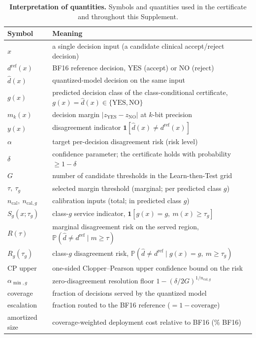 \documentclass[11pt]{article}
\theoremstyle{plain}
\newcommand{\YES}{\mathrm{YES}}
\newcommand{\NO}{\mathrm{NO}}
\newcommand{\Prob}{\mathbb{P}}
\newcommand{\Risk}{R}
\begin{document}
\begin{table}[h]\centering\small
\caption{\textbf{Interpretation of quantities.} Symbols and quantities used in the certificate and
throughout this Supplement.}
\label{stab:notation}
\setlength{\tabcolsep}{8pt}
\renewcommand{\arraystretch}{1.18}
\begin{tabular}{ll}
\toprule
Symbol & Meaning\\
\midrule
$x$ & a single decision input (a candidate clinical accept/reject decision)\\
$d^{\mathrm{ref}}(x)$ & BF16 reference decision, $\YES$ (accept) or $\NO$ (reject)\\
$\hat d(x)$ & quantized-model decision on the same input\\
$g(x)$ & predicted decision class of the class-conditional certificate, $g(x)=\hat d(x)\in\{\YES,\NO\}$\\
$m_k(x)$ & decision margin $|z_\YES-z_\NO|$ at $k$-bit precision\\
$y(x)$ & disagreement indicator $\mathbf{1}[\hat d(x)\neq d^{\mathrm{ref}}(x)]$\\
$\alpha$ & target per-decision disagreement risk (risk level)\\
$\delta$ & confidence parameter; the certificate holds with probability $\ge 1-\delta$\\
$G$ & number of candidate thresholds in the Learn-then-Test grid\\
$\tau,\ \tau_g$ & selected margin threshold (marginal; per predicted class $g$)\\
$n_{\mathrm{cal}},\ n_{\mathrm{cal},g}$ & calibration inputs (total; in predicted class $g$)\\
$S_g(x;\tau_g)$ & class-$g$ service indicator, $\mathbf{1}[g(x)=g,\ m(x)\ge\tau_g]$\\
$\Risk(\tau)$ & marginal disagreement risk on the served region, $\Prob(\hat d\neq d^{\mathrm{ref}}\mid m\ge\tau)$\\
$\Risk_g(\tau_g)$ & class-$g$ disagreement risk, $\Prob(\hat d\neq d^{\mathrm{ref}}\mid g(x)=g,\ m\ge\tau_g)$\\
CP upper & one-sided Clopper--Pearson upper confidence bound on the risk\\
$\alpha_{\min,g}$ & zero-disagreement resolution floor $1-(\delta/2G)^{1/n_{\mathrm{cal},g}}$\\
coverage & fraction of decisions served by the quantized model\\
escalation & fraction routed to the BF16 reference ($=1-\text{coverage}$)\\
amortized size & coverage-weighted deployment cost relative to BF16 (\% BF16)\\
\bottomrule
\end{tabular}
\end{table}
\end{document}
